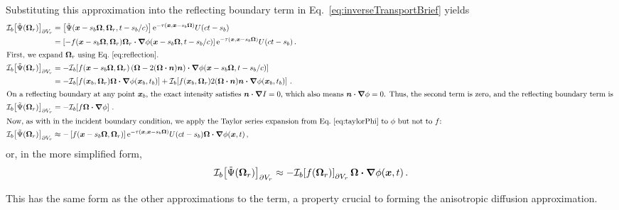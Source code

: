 Substituting this approximation into the reflecting boundary term in
Eq.~\eqref{eq:inverseTransportBrief} yields
\begin{align*}
\lopinv{b}{\tilde\Psi(\vec{\Omega}_r)}_{\partial V_r}
  &= \left[\tilde\Psi(\vec{x} - s_b\vec{\Omega}, \vec{\Omega}_r, t - s_b/c)
  \right]
    \eexp^{ -\tau(\vec{x}, \vec{x} - s_b \vec{\Omega})}
    U(ct - s_b)
\\
  &= \left[-f(\vec{x} - s_b\vec{\Omega}, \vec{\Omega}_r) \vec{\Omega}_r 
  \vd \grad \phi(\vec{x} - s_b\vec{\Omega}, t - s_b/c) \right]
  \eexp^{ -\tau(\vec{x}, \vec{x} - s_b \vec{\Omega})}
  U(ct - s_b) \,.
\\ 
\intertext{First, we expand $\vec{\Omega}_r$ using Eq.~\eqref{eq:reflection}.
}
\lopinv{b}{\tilde\Psi(\vec{\Omega}_r)}_{\partial V_r}
  &= - \lopinv{b}{f(\vec{x} - s_b\vec{\Omega}, \vec{\Omega}_r)
\left(  \vec{\Omega} - 2(\vec{\Omega} \vd \vec{n}) \vec{n} \right)
  \vd \grad \phi(\vec{x} - s_b\vec{\Omega}, t - s_b/c) }
  \\
  &= -\lopinv{b}{f(\vec{x}_b,\vec{\Omega}_r) \vec{\Omega} \vd \grad
  \phi(\vec{x}_b,t_b)}
  + \lopinv{b}{f(\vec{x}_b,\vec{\Omega}_r) 2(\vec{\Omega} \vd \vec{n}) \vec{n} \vd
  \grad \phi(\vec{x}_b,t_b) } \,.
\\ 
\intertext{On a reflecting boundary at any point $\vec{x}_b$, the exact
intensity satisfies $\vec{n} \vd
\grad I = 0$, which also means $\vec{n} \vd \grad \phi=0$. Thus, the second
term is zero, and the reflecting boundary term is
}
\lopinv{b}{\tilde\Psi(\vec{\Omega}_r)}_{\partial V_r}
&= -\lopinv{b}{f \vec{\Omega} \vd \grad \phi} \,.
\\ \intertext{Now, as with in the incident boundary condition, we apply the
Taylor
series expansion from Eq.~\eqref{eq:taylorPhi} to $\phi$ but not to $f$:
}
\lopinv{b}{\tilde\Psi(\vec{\Omega}_r)}_{\partial V_r}
&\approx
-\left[f(\vec{x} - s_b\vec{\Omega}, \vec{\Omega}_r)
  \right]
  \eexp^{ -\tau(\vec{x}, \vec{x} - s_b \vec{\Omega})}
  U(ct - s_b) \vec{\Omega} \vd \grad \phi(\vec{x}, t)\,,
\end{align*}
or, in the more simplified form,
\begin{equation} \label{eq:reflApprox}
\mathcal{I}_{b}\!\left[\tilde\Psi(\bm{\Omega}_r)\right]_{\partial V_r}
\approx  
- \mathcal{I}_{b}\!\left[f(\bm{\Omega}_r)\right]_{\partial V_r}
\bm{\Omega} \bm{\cdot} \bm{\nabla} \phi(\bm{x}, t) \,.
\end{equation}

This has the same form as the other approximations to the term, a property
crucial
to forming the anisotropic diffusion approximation.

